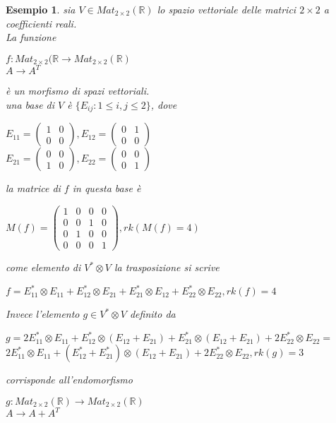 \documentclass[a4paper,12pt]{article}
\theoremstyle{def}
\theoremstyle{prop}
\theoremstyle{esempio}
\newtheorem*{example}{Esempio}
\theoremstyle{dimostrazione}
\theoremstyle{teo}
\theoremstyle{osservazione}
\begin{document}
\begin{example}
	sia \(V \in Mat_{2 \times 2}(\mathbb{R})\) lo spazio vettoriale delle matrici \(2 \times 2\) a coefficienti reali.\\
	La funzione\begin{center}
		\(f: Mat_{2 \times 2}(\mathbb{R} \rightarrow Mat_{2 \times 2}(\mathbb{R})\)\\
		\(A \rightarrow A^T\)
	\end{center}
	è un morfismo di spazi vettoriali.\\
	una base di \(V\) è \(\{E_{ij} : 1 \leq i,j \leq 2\}\), dove
	\begin{center}
		\(E_{11} = \begin{pmatrix}
			1 & 0  \\
			0 & 0
		\end{pmatrix}, 
		E_{12} = \begin{pmatrix}
			0 & 1  \\
			0 & 0
		\end{pmatrix}\)\\
		\(E_{21} = \begin{pmatrix}
			0 & 0  \\
			1 & 0
		\end{pmatrix}, 
		E_{22} = \begin{pmatrix}
			0 & 0  \\
			0 & 1
		\end{pmatrix}\)
	\end{center}
	la matrice di \(f\) in questa base è
	\begin{center}
		\(M(f) = \begin{pmatrix}
			1 & 0 & 0 & 0  \\
			0 & 0 & 1 & 0  \\
			0 & 1 & 0 & 0  \\
			0 & 0 & 0 & 1
		\end{pmatrix}, rk(M(f) = 4)\)
	\end{center}
	come elemento di \(V^* \otimes V\) la trasposizione si scrive
	\begin{center}
		\(f = E_{11}^* \otimes E_{11} + E_{12}^* \otimes E_{21} + E_{21}^* \otimes E_{12} + E_{22}^* \otimes E_{22}, rk(f) = 4\)
	\end{center}
	\newpage
	Invece l'elemento \(g \in V^* \otimes V\) definito da
	\begin{center}
		\(g =  2E_{11}^* \otimes E_{11} + E_{12}^* \otimes (E_{12} + E_{21}) + E_{21}^* \otimes (E_{12} + E_{21}) + 2E_{22}^* \otimes E_{22} = \)\\
		\(2E_{11}^* \otimes E_{11} + (E_{12}^* + E_{21}^*) \otimes (E_{12} + E_{21}) + 2E_{22}^* \otimes E_{22}, rk(g) = 3\)
	\end{center}
	corrisponde all'endomorfismo 
	\begin{center}
		\(g: Mat_{2 \times 2}(\mathbb{R}) \rightarrow Mat_{2 \times 2}(\mathbb{R})\)\\
		\(A \rightarrow A + A^T\)
	\end{center}
\end{example}
\end{document}
